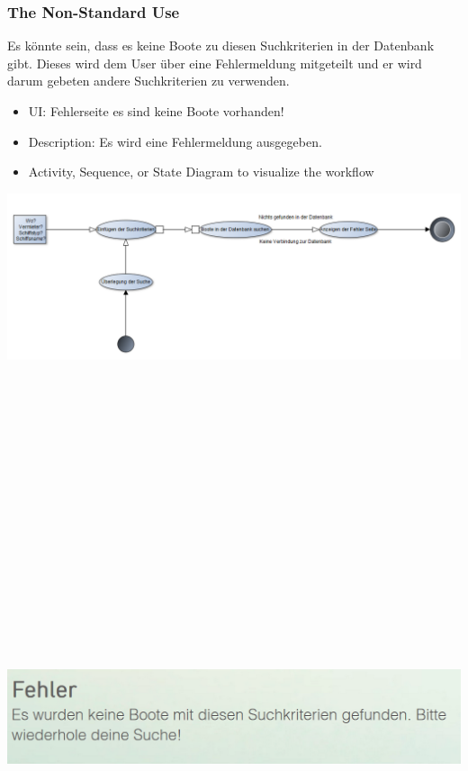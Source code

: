 \documentclass[12pt]{article}
\theoremstyle{definition}
\begin{document}
\subsubsection{The Non-Standard Use}
Es könnte sein, dass es keine Boote zu diesen Suchkriterien in der Datenbank gibt. Dieses wird dem User über eine Fehlermeldung mitgeteilt und er wird darum gebeten andere Suchkriterien zu verwenden.
\begin{itemize}
	\item UI: Fehlerseite es sind keine Boote vorhanden!
	\item Description: Es wird eine Fehlermeldung ausgegeben.
	\item Activity, Sequence, or State Diagram to visualize the workflow
\end{itemize}
\includegraphics[height=0.40\textwidth]{Boote_Suchen_Fehler.PNG}
\begin{center}\includegraphics[width=15cm,height=20cm,keepaspectratio]{Fehler_Suchen.PNG}\end{center}
\end{document}
